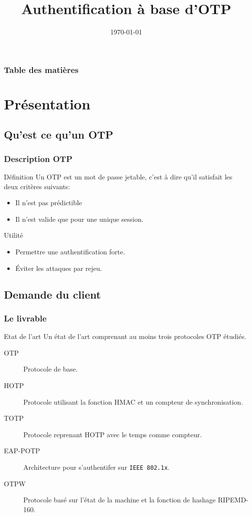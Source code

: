 \documentclass[xcolor=table]{beamer}
\title[M1SSI]{Authentification \`{a} base d'OTP}
\institute[Universit\'{e} de Rouen] {
Universit\'{e} de Rouen \\
\medskip
}
\date{\today}
\begin{document}
\begin{frame}
\titlepage
\end{frame}

\begin{frame}
\frametitle{Table des mati\`{e}res}
\tableofcontents
\end{frame}

\section{Pr\'{e}sentation}

\subsection{Qu'est ce qu'un OTP}

\begin{frame}
\frametitle{Description OTP}
\begin{block}{Définition}
    Un OTP est un mot de passe jetable, c'est à dire qu'il satisfait les deux 
  critères suivants:
  \begin{itemize}
    \item Il n'est pas prédictible
    \item Il n'est valide que pour une unique session.
  \end{itemize}
\end{block}

\begin{block}{Utilité}
  \begin{itemize}
    \item Permettre une authentification forte.
    \item Éviter les attaques par rejeu.
  \end{itemize}
\end{block}
\end{frame}

\subsection{Demande du client}

\begin{frame}
\frametitle{Le livrable}
\begin{block}{Etat de l'art} 
Un état de l'art comprenant au moins trois protocoles OTP étudiés.
\begin{description}
 \item[OTP] Protocole de base.
 \item[HOTP] Protocole utilisant la fonction HMAC et un compteur de 
  synchronisation.
 \item[TOTP] Protocole reprenant HOTP avec le temps comme compteur.
 \item[EAP-POTP] Architecture pour s'authentifer sur \verb?IEEE 802.1x?. 
 \item[OTPW] Protocole basé sur l'état de la machine et la fonction de hashage RIPEMD-160.
\end{description}
\end{block}
\end{frame}
\end{document}
